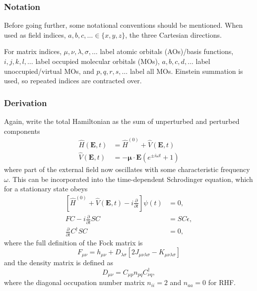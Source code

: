 \hypertarget{notation}{%
  \subsubsection{Notation}\label{notation}}

Before going further, some notational conventions should be mentioned.  When used as field indices, \(a,b,c,\dots \in \{x,y,z\}\), the three Cartesian directions.

For matrix indices, \(\mu,\nu,\lambda,\sigma,\dots\) label atomic orbitals (AOs)/basis functions, \(i,j,k,l,\dots\) label occupied molecular orbitals (MOs), \(a,b,c,d,\dots\) label unoccupied/virtual MOs, and \(p,q,r,s,\dots\) label all MOs. Einstein summation is used, so repeated indices are contracted over.

\subsubsection{Derivation}

Again, write the total Hamiltonian as the sum of unperturbed and perturbed components
\begin{align*}
  \hat{H}(\mathbf{E},t) &= \hat{H}^{(0)} + \hat{V}(\mathbf{E},t) \\
  \hat{V}(\mathbf{E},t) &= -\mathbf{\mu} \cdot \mathbf{E}(e^{\pm i \omega t} + 1) \tag{Karna 2}
\end{align*}
where part of the external field now oscillates with some characteristic frequency \(\omega\). This can be incorporated into the time-dependent Schrodinger equation, which for a stationary state obeys
\begin{align*}
  \left[ \hat{H}^{(0)} + \hat{V}(\mathbf{E},t) - i\frac{\partial}{\partial t} \right] \psi(t) &= 0, \tag{Karna 3} \\
  FC - i \frac{\partial}{\partial t} SC &= SC\epsilon, \tag{Karna 5} \\
  \frac{\partial}{\partial t} C^{\dagger} S C &= 0, \tag{Karna 6}
\end{align*}
where the full definition of the Fock matrix is
\begin{equation}
  F_{\mu\nu} = h_{\mu\nu} + D_{\lambda\sigma}[2J_{\mu\nu\lambda\sigma} - K_{\mu\nu\lambda\sigma}] \tag{Karna 9}
\end{equation}
and the density matrix is defined as
\begin{equation}
  D_{\mu\nu} = C_{\mu p}n_{pq}C_{\nu q}^{\dagger}, \tag{Karna 10}
\end{equation}
where the diagonal occupation number matrix \(n_{ii} = 2\) and \(n_{aa} = 0\) for RHF.

